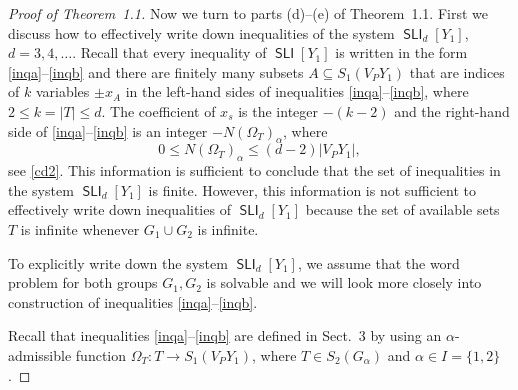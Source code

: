 \documentclass[10pt, reqno]{amsart}
\numberwithin{equation}{section}
\begin{document}
\begin{proof}[Proof of Theorem~1.1]
Now we turn to parts (d)--(e) of Theorem~1.1.
First we discuss  how to effectively write down inequalities of the system $\operatorname{\textsf{SLI}}_d[Y_1]$, $d=3,4, \dots$. Recall that every inequality of $\operatorname{\textsf{SLI}}[Y_1]$ is written in the form \eqref{inqa}--\eqref{inqb} and there are finitely many subsets $A \subseteq S_1(V_PY_1)$ that are indices of $k$ variables $\pm x_A$ in the left-hand sides of inequalities  \eqref{inqa}--\eqref{inqb}, where $2 \le k = |T| \le d$. The coefficient of $x_s$ is the integer $-(k-2)$ and the right-hand side of \eqref{inqa}--\eqref{inqb} is an integer $-N({{\Omega}}_T)_{\alpha}$, where
$$
0 \le N({{\Omega}}_T)_{\alpha} \le (d-2) |   V_P Y_1| ,
$$
see \eqref{cd2}. This information is sufficient to conclude that the set of inequalities in the system $\operatorname{\textsf{SLI}}_d[Y_1]$ is finite. However, this information is not sufficient to effectively write down
inequalities of $\operatorname{\textsf{SLI}}_d[Y_1]$ because the set of available sets $T$ is infinite whenever $G_1 \cup G_2$ is infinite.

To explicitly write down  the system $\operatorname{\textsf{SLI}}_d[Y_1]$, we assume that
the word problem for both groups $G_1, G_2$ is solvable and we will look more closely into construction of inequalities \eqref{inqa}--\eqref{inqb}.

Recall that inequalities \eqref{inqa}--\eqref{inqb} are defined in Sect.~3 by using an ${\alpha}$-admissible function $\Omega_T : T \to S_1( V_P Y_1)$, where $T \in S_2(G_{\alpha})$ and ${\alpha} \in I = \{1,2\}$.


\end{proof}
\end{document}
